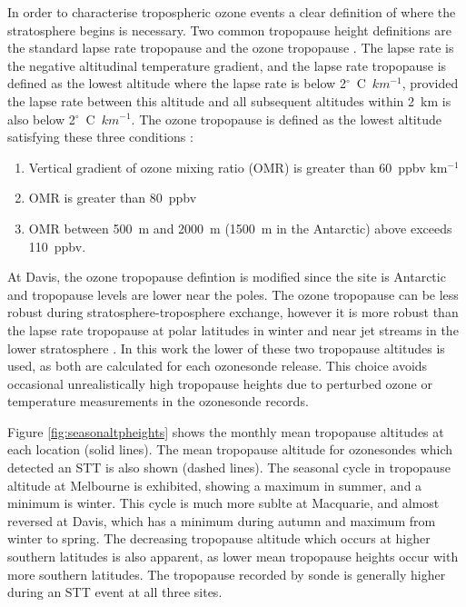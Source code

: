 \documentclass{article}
\begin{document}
    In order to characterise tropospheric ozone events a clear definition of where the stratosphere begins is necessary.
    Two common tropopause height definitions are the standard lapse rate tropopause \citep{WMO1957} and the ozone tropopause \citep{Bethan1996}.
    The lapse rate is the negative altitudinal temperature gradient, and the lapse rate tropopause is defined as the lowest altitude where the lapse rate is below 2$^\circ$~C~$km^{-1}$, provided the lapse rate between this altitude and all subsequent altitudes within 2~km is also below 2$^\circ$~C~$km^{-1}$.
    The ozone tropopause is defined as the lowest altitude satisfying these three conditions \citep{Bethan1996}:
    \begin{enumerate}
      \item Vertical gradient of ozone mixing ratio (OMR) is greater than 60~ppbv km$^{-1}$
      \item OMR is greater than 80~ppbv
      \item OMR between 500~m and 2000~m (1500~m in the Antarctic) above exceeds 110~ppbv.
    \end{enumerate}
    At Davis, the ozone tropopause defintion is modified since the site is Antarctic and tropopause levels are lower near the poles.
    The ozone tropopause can be less robust during stratosphere-troposphere exchange, however it is more robust than the lapse rate tropopause at polar latitudes in winter and near jet streams in the lower stratosphere \citep{Bethan1996, Tomikawa2009, Alexander2013}.
    In this work the lower of these two tropopause altitudes is used, as both are calculated for each ozonesonde release.
    This choice avoids occasional unrealistically high tropopause heights due to perturbed ozone or temperature measurements in the ozonesonde records.
    
    Figure \ref{fig:seasonaltpheights} shows the monthly mean tropopause altitudes at each location (solid lines).
    The mean tropopause altitude for ozonesondes which detected an STT is also shown (dashed lines). 
    The seasonal cycle in tropopause altitude at Melbourne is exhibited, showing a maximum in summer, and a minimum is winter.
    This cycle is much more sublte at Macquarie, and almost reversed at Davis, which has a minimum during autumn and maximum from winter to spring.
    The decreasing tropopause altitude which occurs at higher southern latitudes is also apparent, as lower mean tropopause heights occur with more southern latitudes.
    The tropopause recorded by sonde is generally higher during an STT event at all three sites.
\end{document}
